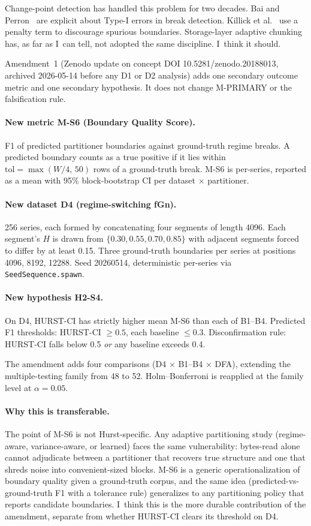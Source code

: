 \documentclass[11pt]{article}
\begin{document}
Change-point detection has handled this problem for two decades. Bai and Perron~\cite{baiperron1998} are explicit about Type-I errors in break detection. Killick et al.~\cite{killick2012pelt} use a penalty term to discourage spurious boundaries. Storage-layer adaptive chunking has, as far as I~can tell, not adopted the same discipline. I~think it should.

Amendment~1 (Zenodo update on concept DOI 10.5281/zenodo.20188013, archived 2026-05-14 before any D1 or D2 analysis) adds one secondary outcome metric and one secondary hypothesis. It does not change M-PRIMARY or the falsification rule.

\paragraph{New metric M-S6 (Boundary Quality Score).} F1 of predicted partitioner boundaries against ground-truth regime breaks. A predicted boundary counts as a true positive if it lies within $\mathrm{tol} = \max(W/4,\,50)$ rows of a ground-truth break. M-S6 is per-series, reported as a mean with 95\% block-bootstrap CI per dataset $\times$ partitioner.

\paragraph{New dataset D4 (regime-switching fGn).} 256 series, each formed by concatenating four segments of length 4096. Each segment's $H$ is drawn from $\{0.30, 0.55, 0.70, 0.85\}$ with adjacent segments forced to differ by at least 0.15. Three ground-truth boundaries per series at positions 4096, 8192, 12288. Seed 20260514, deterministic per-series via \texttt{SeedSequence.spawn}.

\paragraph{New hypothesis H2-S4.} On D4, HURST-CI has strictly higher mean M-S6 than each of B1--B4. Predicted F1 thresholds: HURST-CI $\geq 0.5$, each baseline $\leq 0.3$. Disconfirmation rule: HURST-CI falls below 0.5 \emph{or} any baseline exceeds 0.4.

The amendment adds four comparisons (D4 $\times$ B1--B4 $\times$ DFA), extending the multiple-testing family from 48 to 52. Holm--Bonferroni is reapplied at the family level at $\alpha=0.05$.

\paragraph{Why this is transferable.} The point of M-S6 is not Hurst-specific. Any adaptive partitioning study (regime-aware, variance-aware, or learned) faces the same vulnerability: bytes-read alone cannot adjudicate between a partitioner that recovers true structure and one that shreds noise into convenient-sized blocks. M-S6 is a generic operationalization of boundary quality given a ground-truth corpus, and the same idea (predicted-vs-ground-truth F1 with a tolerance rule) generalizes to any partitioning policy that reports candidate boundaries. I~think this is the more durable contribution of the amendment, separate from whether HURST-CI clears its threshold on D4.
\end{document}
